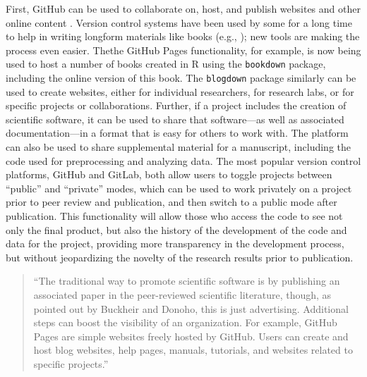\documentclass[]{tufte-book}
\begin{document}
First, GitHub can be used to collaborate on, host, and publish websites and
other online content \citep{perez2016ten}. Version control systems have been used by
some for a long time to help in writing longform materials like books (e.g.,
\citep{raymond2003art}); new tools are making the process even easier. Thethe GitHub
Pages functionality, for example, is now being used to host a number of books
created in R using the \texttt{bookdown} package, including the online version of this
book. The \texttt{blogdown} package similarly can be used to create websites, either
for individual researchers, for research labs, or for specific projects or
collaborations. Further, if a project includes the creation of scientific
software, it can be used to share that software---as well as associated
documentation---in a format that is easy for others to work with. The platform
can also be used to share supplemental material for a manuscript, including the
code used for preprocessing and analyzing data. The most popular version control
platforms, GitHub and GitLab, both allow users to toggle projects between
``public'' and ``private'' modes, which can be used to work privately on a
project prior to peer review and publication, and then switch to a public mode
after publication. This functionality will allow those who access the code to
see not only the final product, but also the history of the development of the
code and data for the project, providing more transparency in the development
process, but without jeopardizing the novelty of the research results prior to
publication.

\begin{quote}
``The traditional way to promote scientific software is by publishing an
associated paper in the peer-reviewed scientific literature, though, as pointed
out by Buckheir and Donoho, this is just advertising. Additional steps can boost
the visibility of an organization. For example, GitHub Pages are simple websites
freely hosted by GitHub. Users can create and host blog websites, help pages,
manuals, tutorials, and websites related to specific projects.'' \citep{perez2016ten}
\end{quote}
\end{document}
